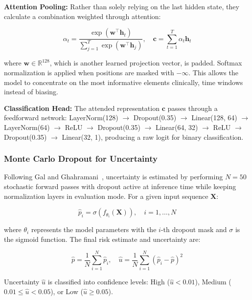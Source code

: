 \documentclass[conference]{IEEEtran}
\begin{document}
\textbf{Attention Pooling:} Rather than solely relying on the last hidden state, they calculate a combination weighted through attention:

\begin{equation}
\alpha_t = \frac{\exp(\mathbf{w}^\top \mathbf{h}_t)}{\sum_{j=1}^{T} \exp(\mathbf{w}^\top \mathbf{h}_j)}, \quad \mathbf{c} = \sum_{t=1}^{T} \alpha_t \mathbf{h}_t
\end{equation}

where $\mathbf{w} \in \mathbb{R}^{128}$, which is another learned projection vector, is padded. Softmax normalization is applied when positions are masked with $-\infty$. This allows the model to concentrate on the most informative elements clinically, time windows instead of biasing.

\textbf{Classification Head:} The attended representation $\mathbf{c}$ passes through a feedforward network: LayerNorm(128) $\rightarrow$ Dropout(0.35) $\rightarrow$ Linear(128, 64) $\rightarrow$ LayerNorm(64) $\rightarrow$ ReLU $\rightarrow$ Dropout(0.35) $\rightarrow$ Linear(64, 32) $\rightarrow$ ReLU $\rightarrow$ Dropout(0.35) $\rightarrow$ Linear(32, 1), producing a raw logit for binary classification.

\subsubsection{Monte Carlo Dropout for Uncertainty}
Following Gal and Ghahramani~\cite{Gal2016}, uncertainty is estimated by performing $N = 50$ stochastic forward passes with dropout active at inference time while keeping normalization layers in evaluation mode. For a given input sequence $\mathbf{X}$:

\begin{equation}
\hat{p}_i = \sigma(f_{\theta_i}(\mathbf{X})), \quad i = 1, \ldots, N
\end{equation}

where $\theta_i$ represents the model parameters with the $i$-th dropout mask and $\sigma$ is the sigmoid function. The final risk estimate and uncertainty are:

\begin{equation}
\hat{p} = \frac{1}{N} \sum_{i=1}^{N} \hat{p}_i, \quad \hat{u} = \frac{1}{N} \sum_{i=1}^{N} (\hat{p}_i - \hat{p})^2
\end{equation}

Uncertainty $\hat{u}$ is classified into confidence levels: High ($\hat{u} < 0.01$), Medium ($0.01 \leq \hat{u} < 0.05$), or Low ($\hat{u} \geq 0.05$).
\end{document}
